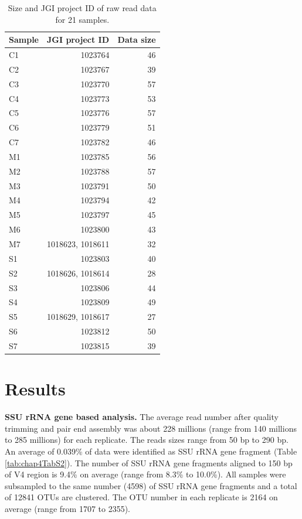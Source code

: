 \documentclass[]{msu-thesis}
\begin{document}
\begin{table}[htbp]
  \centering
  \caption[Size and JGI project ID of raw read data]{Size and JGI project ID of raw read data for 21 samples.}
    \begin{tabular}{|lrr|}
    \toprule
    Sample & \multicolumn{1}{l}{JGI project ID} & \multicolumn{1}{l|}{Data size} \\
    \midrule
    C1    & 1023764 & 46 \\
    C2    & 1023767 & 39 \\
    C3    & 1023770 & 57 \\
    C4    & 1023773 & 53 \\
    C5    & 1023776 & 57 \\
    C6    & 1023779 & 51 \\
    C7    & 1023782 & 46 \\
    M1    & 1023785 & 56 \\
    M2    & 1023788 & 57 \\
    M3    & 1023791 & 50 \\
    M4    & 1023794 & 42 \\
    M5    & 1023797 & 45 \\
    M6    & 1023800 & 43 \\
    M7    & \multicolumn{1}{l}{1018623, 1018611} & 32 \\
    S1    & 1023803 & 40 \\
    S2    & \multicolumn{1}{l}{1018626, 1018614} & 28 \\
    S3    & 1023806 & 44 \\
    S4    & 1023809 & 49 \\
    S5    & \multicolumn{1}{l}{1018629, 1018617} & 27 \\
    S6    & 1023812 & 50 \\
    S7    & 1023815 & 39 \\
    \bottomrule
    \end{tabular}%
  \label{tab:chap4TabS1}%
\end{table}%


\section{Results}

\textbf{SSU rRNA gene based analysis. }
The average read number after quality trimming and pair end assembly was about 228 millions (range from 140 millions to 285 millions) for each replicate. The reads sizes range from 50 bp to 290 bp. An average of 0.039\% of data were identified as SSU rRNA gene fragment (Table \ref{tab:chap4TabS2}). The number of SSU rRNA gene fragments aligned to 150 bp of V4 region is 9.4\% on average (range from 8.3\% to 10.0\%). All samples were subsampled to the same number (4598) of SSU rRNA gene fragments and a total of 12841 OTUs are clustered. The OTU number in each replicate is 2164 on average (range from 1707 to 2355).
\end{document}
